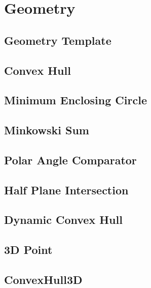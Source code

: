 \documentclass{article}
\begin{document}
\section{Geometry}

\subsection{Geometry Template}


\subsection{Convex Hull}


\subsection{Minimum Enclosing Circle}


\subsection{Minkowski Sum}


\subsection{Polar Angle Comparator}


\subsection{Half Plane Intersection}


\subsection{Dynamic Convex Hull}


\subsection{3D Point}


\subsection{ConvexHull3D}

\end{document}
